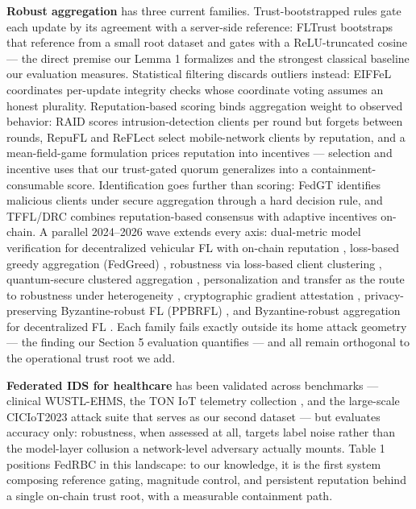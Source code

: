 \documentclass[cmc,article,submit,moreauthors,pdftex]{Definitions/tsp}
\begin{document}
\textbf{Robust aggregation} has three current families. Trust-bootstrapped rules gate each update by its agreement with a server-side reference: FLTrust \cite{ref-37} bootstraps that reference from a small root dataset and gates with a ReLU-truncated cosine --- the direct premise our Lemma 1 formalizes and the strongest classical baseline our evaluation measures. Statistical filtering discards outliers instead: EIFFeL \cite{ref-20} coordinates per-update integrity checks whose coordinate voting assumes an honest plurality. Reputation-based scoring binds aggregation weight to observed behavior: RAID \cite{ref-21} scores intrusion-detection clients per round but forgets between rounds, RepuFL \cite{ref-38} and ReFLect \cite{ref-39} select mobile-network clients by reputation, and a mean-field-game formulation \cite{ref-40} prices reputation into incentives --- selection and incentive uses that our trust-gated quorum generalizes into a containment-consumable score. Identification goes further than scoring: FedGT \cite{ref-41} identifies malicious clients under secure aggregation through a hard decision rule, and TFFL/DRC \cite{ref-42} combines reputation-based consensus with adaptive incentives on-chain. A parallel 2024--2026 wave extends every axis: dual-metric model verification for decentralized vehicular FL with on-chain reputation \cite{ref-43}, loss-based greedy aggregation (FedGreed) \cite{ref-44}, robustness via loss-based client clustering \cite{ref-45}, quantum-secure clustered aggregation \cite{ref-46}, personalization and transfer as the route to robustness under heterogeneity \cite{ref-47}, cryptographic gradient attestation \cite{ref-48}, privacy-preserving Byzantine-robust FL (PPBRFL) \cite{ref-49}, and Byzantine-robust aggregation for decentralized FL \cite{ref-50}. Each family fails exactly outside its home attack geometry --- the finding our Section 5 evaluation quantifies --- and all remain orthogonal to the operational trust root we add.

\textbf{Federated IDS for healthcare} has been validated across benchmarks --- clinical WUSTL-EHMS, the TON IoT telemetry collection \cite{ref-51}, and the large-scale CICIoT2023 attack suite \cite{ref-52} that serves as our second dataset --- but evaluates accuracy only: robustness, when assessed at all, targets label noise rather than the model-layer collusion a network-level adversary actually mounts. Table 1 positions FedRBC in this landscape: to our knowledge, it is the first system composing reference gating, magnitude control, and persistent reputation behind a single on-chain trust root, with a measurable containment path.
\end{document}
